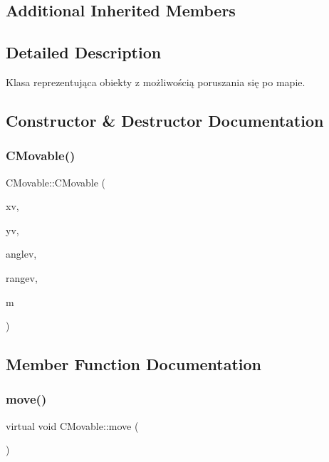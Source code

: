 \subsection*{Additional Inherited Members}


\subsection{Detailed Description}
Klasa reprezentująca obiekty z możliwością poruszania się po mapie. 

\subsection{Constructor \& Destructor Documentation}
\mbox{\label{class_c_movable_a5f049731afad44da86ff6e3684c258e9}} 
\subsubsection{\texorpdfstring{C\+Movable()}{CMovable()}}
{\footnotesize\ttfamily C\+Movable\+::\+C\+Movable (\begin{DoxyParamCaption}\item[{qreal}]{xv,  }\item[{qreal}]{yv,  }\item[{qreal}]{anglev,  }\item[{qreal}]{rangev,  }\item[{\mbox{\hyperlink{class_c_map}{C\+Map}} $\ast$}]{m }\end{DoxyParamCaption})}



\subsection{Member Function Documentation}
\mbox{\label{class_c_movable_a8e66e106f13362d24462ce0c9d0431af}} 
\subsubsection{\texorpdfstring{move()}{move()}}
{\footnotesize\ttfamily virtual void C\+Movable\+::move (\begin{DoxyParamCaption}{ }\end{DoxyParamCaption})\hspace{0.3cm}{\ttfamily [pure virtual]}}



